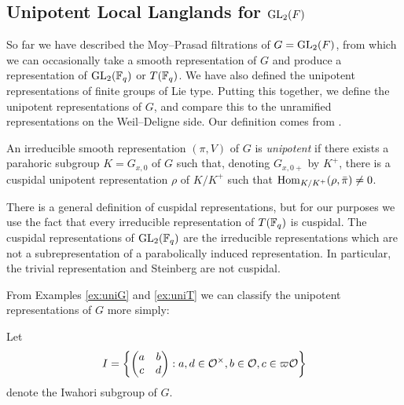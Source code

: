 \subsection{Unipotent Local Langlands for \texorpdfstring{$\mathrm{GL}_2(F)$}{TEXT}}

So far we have described the Moy--Prasad filtrations of $G=\mathrm{GL}_2(F)$, from which we can occasionally take a smooth representation of $G$ and produce a representation of $\mathrm{GL}_2(\mathbb{F}_q)$ or $T(\mathbb{F}_q)$. We have also defined the unipotent representations of finite groups of Lie type. Putting this together, we define the unipotent representations of $G$, and compare this to the unramified representations on the Weil--Deligne side. Our definition comes from \cite{Lus1}.

\begin{defn}
    An irreducible smooth representation $(\pi,V)$ of $G$ is \textit{unipotent} if there exists a parahoric subgroup $K=G_{x,0}$ of $G$ such that, denoting $G_{x,0+}$ by $K^+$, there is a cuspidal unipotent representation $\rho$ of $K/K^+$ such that $\mathrm{Hom}_{K/K^+}(\rho, \bar{\pi}) \neq 0$.
\end{defn}
\begin{rem}
    There is a general definition of cuspidal representations, but for our purposes we use the fact that every irreducible representation of $T(\mathbb{F}_q)$ is cuspidal. The cuspidal representations of $\mathrm{GL}_2(\mathbb{F}_q)$ are the irreducible representations which are not a subrepresentation of a parabolically induced representation. In particular, the trivial representation and Steinberg are not cuspidal.
\end{rem}

From Examples \ref{ex:uniG} and \ref{ex:uniT} we can classify the unipotent representations of $G$ more simply:

\begin{notn}
    Let 
    $$I = \left\{ \begin{pmatrix}
        a&b\\c&d
    \end{pmatrix} : a,d \in \mathcal{O}^\times, b \in \mathcal{O}, c \in \varpi\mathcal{O}\right\}$$ denote the Iwahori subgroup of $G$.
\end{notn}

